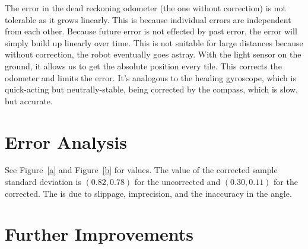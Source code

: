 \documentclass[twocolumn]{article}
\begin{document}
The error in the dead reckoning odometer (the one without correction) is not tolerable as it grows linearly. This is because individual errors are independent from each other. Because future error is not effected by past error, the error will simply build up linearly over time. This is not suitable for large distances because without correction, the robot eventually goes astray. With the light sensor on the ground, it allows us to get the absolute position every tile. This corrects the odometer and limits the error. It's analogous to the heading gyroscope, which is quick-acting but neutrally-stable, being corrected by the compass, which is slow, but accurate.

\section{Error Analysis}

See Figure~\ref{a} and Figure~\ref{b} for values. The value
of the corrected sample standard deviation is $(0.82, 0.78)$ for
the uncorrected and $(0.30, 0.11)$ for the corrected. The is due to slippage, imprecision, and the inaccuracy in the angle.

\section{Further Improvements}
\end{document}
